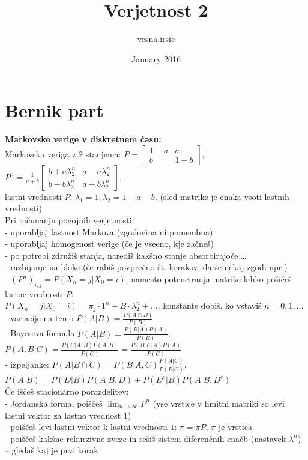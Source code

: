 \documentclass[a4paper, oneside, 12pt]{article}
\title{Verjetnost 2}
\author{vesna.irsic }
\date{January 2016}
\theoremstyle{definition}
\begin{document}
\pagestyle{empty}

\section*{Bernik part}
\textbf{Markovske verige v diskretnem času:}\\
Markovska veriga z 2 stanjema:
$P = \begin{bmatrix}
1-a & a  \\
b & 1-b\end{bmatrix}$,
$P^n = \frac{1}{a+b}
\begin{bmatrix} b+ a \lambda_2^n & a-a \lambda_2^n \\
b-b\lambda_2^n & a+ b \lambda_2^n \end{bmatrix}$, \\
lastni vrednosti $P$: $\lambda_1 = 1, \lambda_2 = 1-a-b$.
(sled matrike je enaka vsoti lastnih vrednosti)\\
Pri računanju pogojnih verjetnosti:\\
- uporabljaj lastnost Markova (zgodovina ni pomembna)\\
- uporabljaj homogenost verige (če je vseeno, kje začneš)\\
- po potrebi združiš stanja, narediš kakšno stanje absorbirajoče \ldots \\
- razbijanje na bloke (če rabiš povprečno št. korakov, da se nekaj zgodi npr.)\\
- $(P^n)_{i,j} = P(X_n = j | X_0 = i)$; namesto potenciranja matrike lahko pošičeš lastne vrednosti $P$: \\$ P(X_n=j | X_0=i) = \pi_j \cdot 1^n + B \cdot \lambda_2^n + \ldots$, konstante dobiš, ko vstaviš $n = 0, 1, \ldots$\\
- variacije na temo $P(A|B) = \frac{P(A \cap B)}{P(B)}$\\
- Bayesova formula $P(A|B)=\frac{P(B|A) P(A)}{P(B)}$; $P(A,B|C) = \frac{P(C|A,B)P(A,B)}{P(C)} = \frac{P(B,C|A)P(A)}{P(C)}$\\
- izpeljanke: $P(A|B\cap C) = P(B|A,C)\frac{P(A|C)}{P(B|C)}$, $P(A|B) = P(D|B) P(A| B,D) + P(D^c|B) P(A|B,D^c)$\\
Če iščeš stacionarno porazdelitev:\\
- Jordanska forma, poiščeš $\lim_{n \to \infty} P^n$ (vse vrstice v limitni matriki so levi lastni vektor za lastno vrednost 1)\\
- poiščeš levi lastni vektor k lastni vrednosti $1$: $\pi = \pi P$, $\pi$ je vrstica\\
- poiščeš kakšne rekurzivne zveze in rešiš sistem diferenčnih enačb (nastavek $\lambda^n$) -- gledaš kaj je prvi korak\\
\end{document}
